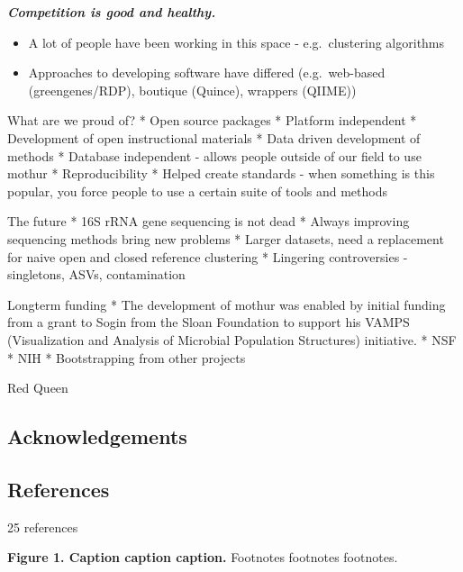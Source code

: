 \documentclass[11pt,]{article}
\providecommand{\tightlist}{%
  \setlength{\itemsep}{0pt}\setlength{\parskip}{0pt}}
\begin{document}
\textbf{\emph{Competition is good and healthy.}}

\begin{itemize}
\tightlist
\item
  A lot of people have been working in this space - e.g.~clustering
  algorithms
\item
  Approaches to developing software have differed (e.g.~web-based
  (greengenes/RDP), boutique (Quince), wrappers (QIIME))
\end{itemize}

What are we proud of? * Open source packages * Platform independent *
Development of open instructional materials * Data driven development of
methods * Database independent - allows people outside of our field to
use mothur * Reproducibility * Helped create standards - when something
is this popular, you force people to use a certain suite of tools and
methods

The future * 16S rRNA gene sequencing is not dead * Always improving
sequencing methods bring new problems * Larger datasets, need a
replacement for naive open and closed reference clustering * Lingering
controversies - singletons, ASVs, contamination

Longterm funding * The development of mothur was enabled by initial
funding from a grant to Sogin from the Sloan Foundation to support his
VAMPS (Visualization and Analysis of Microbial Population Structures)
initiative. * NSF * NIH * Bootstrapping from other projects

Red Queen

\newpage

\hypertarget{acknowledgements}{%
\subsection{Acknowledgements}\label{acknowledgements}}

\newpage

\hypertarget{references}{%
\subsection{References}\label{references}}

25 references

\hypertarget{refs}{}

\newpage

\textbf{Figure 1. Caption caption caption.} Footnotes footnotes
footnotes.
\end{document}
